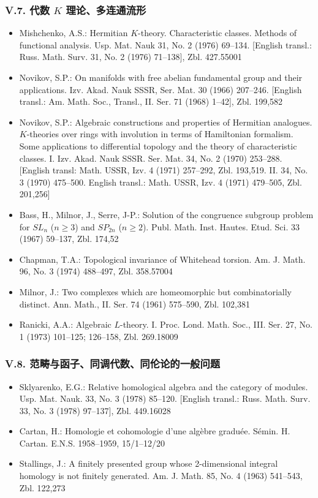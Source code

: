 \subsubsection*{V.7. 代数 $K$ 理论、多连通流形}

\begin{itemize}
\item Mishchenko, A.S.: Hermitian $K$-theory. Characteristic classes. Methods of functional analysis. Usp. Mat. Nauk 31, No. 2 (1976) 69--134. [English transl.: Russ. Math. Surv. 31, No. 2 (1976) 71--138], Zbl. 427.55001
\item Novikov, S.P.: On manifolds with free abelian fundamental group and their applications. Izv. Akad. Nauk SSSR, Ser. Mat. 30 (1966) 207--246. [English transl.: Am. Math. Soc., Transl., II. Ser. 71 (1968) 1--42], Zbl. 199,582
\item Novikov, S.P.: Algebraic constructions and properties of Hermitian analogues. $K$-theories over rings with involution in terms of Hamiltonian formalism. Some applications to differential topology and the theory of characteristic classes. I. Izv. Akad. Nauk SSSR. Ser. Mat. 34, No. 2 (1970) 253--288. [English transl: Math. USSR, Izv. 4 (1971) 257--292, Zbl. 193,519. II. 34, No. 3 (1970) 475--500. English transl.: Math. USSR, Izv. 4 (1971) 479--505, Zbl. 201,256]
\item Bass, H., Milnor, J., Serre, J-P.: Solution of the congruence subgroup problem for $SL_n$ ($n\ge3$) and $SP_{2n}$ ($n\ge2$). Publ. Math. Inst. Hautes. Etud. Sci. 33 (1967) 59--137, Zbl. 174,52
\item Chapman, T.A.: Topological invariance of Whitehead torsion. Am. J. Math. 96, No. 3 (1974) 488--497, Zbl. 358.57004
\item Milnor, J.: Two complexes which are homeomorphic but combinatorially distinct. Ann. Math., II. Ser. 74 (1961) 575--590, Zbl. 102,381
\item Ranicki, A.A.: Algebraic $L$-theory. I. Proc. Lond. Math. Soc., III. Ser. 27, No. 1 (1973) 101--125; 126--158, Zbl. 269.18009
\end{itemize}

\subsubsection*{V.8. 范畴与函子、同调代数、同伦论的一般问题}

\begin{itemize}
\item Sklyarenko, E.G.: Relative homological algebra and the category of modules. Usp. Mat. Nauk. 33, No. 3 (1978) 85--120. [English transl.: Russ. Math. Surv. 33, No. 3 (1978) 97--137], Zbl. 449.16028
\item Cartan, H.: Homologie et cohomologie d'une algèbre graduée. Sémin. H. Cartan. E.N.S. 1958--1959, 15/1--12/20
\item Stallings, J.: A finitely presented group whose 2-dimensional integral homology is not finitely generated. Am. J. Math. 85, No. 4 (1963) 541--543, Zbl. 122,273
\end{itemize}

